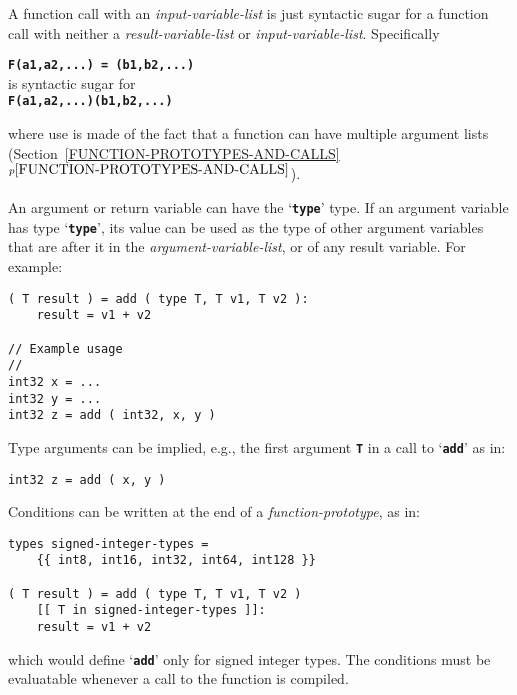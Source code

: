 \documentclass[12pt]{article}
\newcommand{\TT}[1]{{\tt \bfseries #1}}
\newcommand{\itemref}[1]{\ref{#1}$^{p\pageref{#1}}$}
\newenvironment{indpar}[1][0.3in]%
	{\begin{list}{}%
		     {\setlength{\itemsep}{0in}%
		      \setlength{\topsep}{0in}%
		      \setlength{\parsep}{1ex}%
		      \setlength{\labelwidth}{#1}%
		      \setlength{\leftmargin}{#1}%
		      \addtolength{\leftmargin}{\labelsep}}%
	 \item}%
	{\end{list}}
\begin{document}
A function call with an {\em input-variable-list} is just syntactic
sugar for a function call with neither a {\em result-variable-list}
or {\em input-variable-list}.  Specifically
\begin{center}
\TT{F(a1,a2,...)~=~(b1,b2,...)} \\
is syntactic sugar for \\
\TT{F(a1,a2,...)(b1,b2,...)} \\
\end{center}

where use is made of the fact that a function can have multiple
argument lists (Section~\itemref{FUNCTION-PROTOTYPES-AND-CALLS}).

An argument or return variable can have the `\TT{type}' type.
If an argument variable has type `\TT{type}', its value can be used as the
type of other argument variables that are
after it in the {\em argument-variable-list},
or of any result variable.  For example:

\begin{indpar}\begin{verbatim}
( T result ) = add ( type T, T v1, T v2 ):
    result = v1 + v2

// Example usage
//
int32 x = ...
int32 y = ...
int32 z = add ( int32, x, y )
\end{verbatim}\end{indpar}

Type arguments can be implied, e.g., the first argument \TT{T}
in a call to `\TT{add}' as in:

\begin{indpar}\begin{verbatim}
int32 z = add ( x, y )
\end{verbatim}\end{indpar}

Conditions can be written at the end of a {\em function-prototype},
as in:
\begin{indpar}\begin{verbatim}
types signed-integer-types =
    {{ int8, int16, int32, int64, int128 }}

( T result ) = add ( type T, T v1, T v2 )
    [[ T in signed-integer-types ]]:
    result = v1 + v2
\end{verbatim}\end{indpar}

which would define `\TT{add}' only for signed integer types.
The conditions must be evaluatable whenever a call to the
function is compiled.
\end{document}
